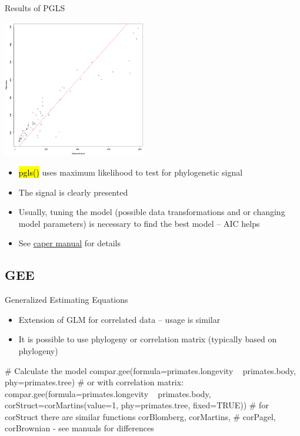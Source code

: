 \documentclass[compress, ucs, xelatex, 11pt, xcolor=svgnames,
  hyperref={
    bookmarks=true,
    unicode=true,
    colorlinks=true,
    pdftitle={Molecular data in R},
    plainpages=false,
    pdfauthor={Vojtech Zeisek},
    pdfsubject={Course about phylogeny and evolution in R},
    pdfcreator={XeLaTeX},
    pdfkeywords={R, evolution, phylogeny, molecular data},
    linkcolor=Tomato,
    anchorcolor=SaddleBrown,
    citecolor=Goldenrod,
    filecolor=DarkMagenta,
    menucolor=Sienna,
    urlcolor=DarkTurquoise,
    pdftex},
  url={hyphens, lowtilde} %
  ]{beamer}
\renewcommand{\texttt}[1]{\hl{\ttfamily #1}}
\begin{document}
\begin{frame}[fragile]{Results of PGLS}
  \begin{multicols}{2}
    \includegraphics[height=6cm]{shorebirds.png}
    \begin{itemize}
      \item \texttt{pgls()} uses maximum likelihood to test for phylogenetic signal
      \item The signal is clearly presented
      \item Usually, tuning the model (possible data transformations and or changing model parameters) is necessary to find the best model -- AIC helps
      \item See \href{https://CRAN.R-project.org/package=caper}{caper manual} for details
    \end{itemize}
  \end{multicols}
\end{frame}

\subsection{GEE}

\begin{frame}[fragile]{Generalized Estimating Equations}
  \begin{itemize}
    \item Extension of GLM for correlated data -- usage is similar
    \item It is possible to use phylogeny or correlation matrix (typically based on phylogeny)
  \end{itemize}
  \vfil
  \begin{spluscode}
    # Calculate the model
    compar.gee(formula=primates.longevity ~ primates.body,
      phy=primates.tree)
    # or with correlation matrix:
    compar.gee(formula=primates.longevity ~ primates.body,
      corStruct=corMartins(value=1, phy=primates.tree, fixed=TRUE))
    # for corStruct there are similar functions corBlomberg, corMartins,
    # corPagel, corBrownian - see manuals for differences
  \end{spluscode}
\end{frame}
\end{document}
